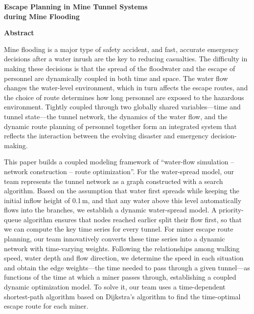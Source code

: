 \documentclass[12pt,a4paper]{article}
\begin{document}
\begin{center}
  {\LARGE\bfseries Escape Planning in Mine Tunnel Systems\\[2pt] during Mine Flooding}
\end{center}
\vspace{-0.3em}
\begin{center}
  {\Large\bfseries Abstract}
\end{center}
\vspace{-0.5em}
\begingroup\linespread{1.0}\selectfont
\enlargethispage{3\baselineskip}

Mine flooding is a major type of safety accident, and fast, accurate emergency decisions after a water inrush are the key to reducing casualties. The difficulty in making these decisions is that the spread of the floodwater and the escape of personnel are dynamically coupled in both time and space. The water flow changes the water-level environment, which in turn affects the escape routes, and the choice of route determines how long personnel are exposed to the hazardous environment. Tightly coupled through two globally shared variables---time and tunnel state---the tunnel network, the dynamics of the water flow, and the dynamic route planning of personnel together form an integrated system that reflects the interaction between the evolving disaster and emergency decision-making.

This paper builds a coupled modeling framework of ``water-flow simulation -- network construction -- route optimization''. For the water-spread model, our team represents the tunnel network as a graph constructed with a search algorithm. Based on the assumption that water first spreads while keeping the initial inflow height of 0.1\,m, and that any water above this level automatically flows into the branches, we establish a dynamic water-spread model. A priority-queue algorithm ensures that nodes reached earlier split their flow first, so that we can compute the key time series for every tunnel. For miner escape route planning, our team innovatively converts these time series into a dynamic network with time-varying weights. Following the relationships among walking speed, water depth and flow direction, we determine the speed in each situation and obtain the edge weights---the time needed to pass through a given tunnel---as functions of the time at which a miner passes through, establishing a coupled dynamic optimization model. To solve it, our team uses a time-dependent shortest-path algorithm based on Dijkstra's algorithm to find the time-optimal escape route for each miner.
\end{document}
